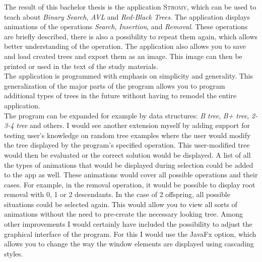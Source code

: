 \documentclass[
  biblatex=false,
  font=serif,
  glossaries=false,
  tables=false,
  theorems=false,
  index
]{kidiplom}
\begin{document}
\begin{kiconclusions}[english]
\indent \indent The result of this bachelor thesis is the application \textsc{Stromy}, which can be used to teach about \textit{Binary Search}, \textit{AVL} and \textit{Red-Black Trees}. The application displays animations of the operations \textit{Search}, \textit{Insertion}, and \textit{Removal}. These operations are briefly described, there is also a possibility to repeat them again, which allows better understanding of the operation. The application also allows you to save and load created trees and export them as an image. This image can then be printed or used in the text of the study materials.\\
\indent The application is programmed with emphasis on simplicity and generality. This generalization of the major parts of the program allows you to program additional types of trees in the future without having to remodel the entire application.\\
\indent The program can be expanded for example by data structures: \textit{B tree}, \textit{B+ tree}, \textit{2-3-4 tree} and others. I would see another extension myself by adding support for testing user's knowledge on random tree examples where the user would modify the tree displayed by the program's specified operation. This user-modified tree would then be evaluated or the correct solution would be displayed. A list of all the types of animations that would be displayed during selection could be added to the app as well. These animations would cover all possible operations and their cases. For example, in the removal operation, it would be possible to display root removal with 0, 1 or 2 descendants. In the case of 2 offspring, all possible situations could be selected again. This would allow you to view all sorts of animations without the need to pre-create the necessary looking tree. Among other improvements I would certainly have included the possibility to adjust the graphical interface of the program. For this I would use the JavaFx option, which allows you to change the way the window elements are displayed using cascading styles.
\end{kiconclusions}

\appendix

\end{document}
